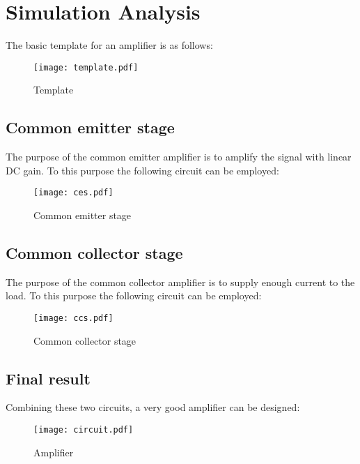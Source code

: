 \newpage

\section{Simulation Analysis}
\label{sec:simulation}

The basic template for an amplifier is as follows:

\begin{figure}[H]
        \centering
        \texttt{[image: template.pdf]}
        \caption{Template}
        \label{template}
\end{figure}

\subsection{Common emitter stage}

The purpose of the common emitter amplifier is to amplify the signal with linear DC gain. To this purpose the following circuit can be employed:

\begin{figure}[H]
        \centering
        \texttt{[image: ces.pdf]}
        \caption{Common emitter stage}
        \label{ces}
\end{figure}

\subsection{Common collector stage}

The purpose of the common collector amplifier is to supply enough current to the load. To this purpose the following circuit can be employed:

\begin{figure}[H]
        \centering
        \texttt{[image: ccs.pdf]}
        \caption{Common collector stage}
        \label{ccs}
\end{figure}

\subsection{Final result}

Combining these two circuits, a very good amplifier can be designed:

\begin{figure}[H]
        \centering
        \texttt{[image: circuit.pdf]}
        \caption{Amplifier}
        \label{circuit}
\end{figure}

